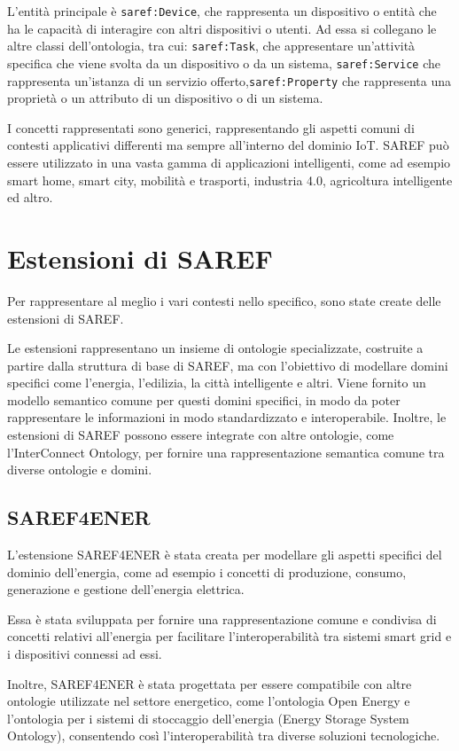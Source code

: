 L'entità principale è \texttt{saref:Device}, che rappresenta un dispositivo o
entità che ha le capacità di interagire con altri dispositivi o utenti. Ad essa
si collegano le altre classi dell'ontologia, tra cui: \texttt{saref:Task}, che
appresentare un'attività specifica che viene svolta da un dispositivo o da un
sistema, \texttt{saref:Service} che rappresenta un'istanza di un servizio
offerto,\texttt{saref:Property} che rappresenta una proprietà o un attributo di
un dispositivo o di un sistema.

I concetti rappresentati sono generici, rappresentando gli aspetti comuni di
contesti applicativi differenti ma sempre all'interno del dominio IoT. SAREF
può essere utilizzato in una vasta gamma di applicazioni intelligenti,
come ad esempio smart home, smart city, mobilità e trasporti, industria 4.0,
agricoltura intelligente ed altro.

\section{Estensioni di SAREF}
Per rappresentare al meglio i vari contesti nello specifico, sono state create
delle estensioni di SAREF.

Le estensioni rappresentano un insieme di ontologie specializzate, costruite a
partire dalla struttura di base di SAREF, ma con l'obiettivo di
modellare domini specifici come l'energia, l'edilizia, la città intelligente e
altri. Viene fornito un modello semantico comune per questi domini specifici,
in modo da poter rappresentare le informazioni in modo standardizzato e
interoperabile.
Inoltre, le estensioni di SAREF possono essere integrate con altre ontologie,
come l'InterConnect Ontology, per fornire una rappresentazione semantica comune
tra diverse ontologie e domini.

\subsection{SAREF4ENER}
L'estensione SAREF4ENER è stata creata per modellare gli aspetti specifici del
dominio dell'energia, come ad esempio i concetti di produzione, consumo,
generazione e gestione dell'energia elettrica.

Essa è stata sviluppata per fornire una rappresentazione comune e condivisa di
concetti relativi all'energia per facilitare l'interoperabilità tra sistemi
smart grid e i dispositivi connessi ad essi.

Inoltre, SAREF4ENER è stata progettata per essere compatibile con altre
ontologie utilizzate nel settore energetico, come l'ontologia Open Energy e
l'ontologia per i sistemi di stoccaggio dell'energia (Energy Storage System
Ontology), consentendo così l'interoperabilità tra diverse soluzioni
tecnologiche.

